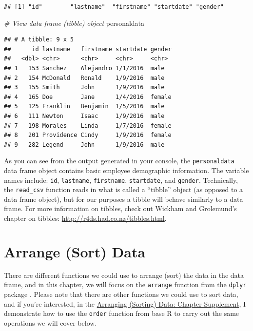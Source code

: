 \documentclass[]{book}
\newenvironment{Shaded}{\begin{snugshade}}{\end{snugshade}}
\newcommand{\CommentTok}[1]{\textcolor[rgb]{0.56,0.35,0.01}{\textit{#1}}}
\newcommand{\NormalTok}[1]{#1}
\begin{document}
\begin{verbatim}
## [1] "id"        "lastname"  "firstname" "startdate" "gender"
\end{verbatim}

\begin{Shaded}
\begin{Highlighting}[]
\CommentTok{# View data frame (tibble) object}
\NormalTok{personaldata}
\end{Highlighting}
\end{Shaded}

\begin{verbatim}
## # A tibble: 9 x 5
##      id lastname   firstname startdate gender
##   <dbl> <chr>      <chr>     <chr>     <chr> 
## 1   153 Sanchez    Alejandro 1/1/2016  male  
## 2   154 McDonald   Ronald    1/9/2016  male  
## 3   155 Smith      John      1/9/2016  male  
## 4   165 Doe        Jane      1/4/2016  female
## 5   125 Franklin   Benjamin  1/5/2016  male  
## 6   111 Newton     Isaac     1/9/2016  male  
## 7   198 Morales    Linda     1/7/2016  female
## 8   201 Providence Cindy     1/9/2016  female
## 9   282 Legend     John      1/9/2016  male
\end{verbatim}

As you can see from the output generated in your console, the
\texttt{personaldata} data frame object contains basic employee
demographic information. The variable names include: \texttt{id},
\texttt{lastname}, \texttt{firstname}, \texttt{startdate}, and
\texttt{gender}. Technically, the \texttt{read\_csv} function reads in
what is called a ``tibble'' object (as opposed to a data frame object),
but for our purposes a tibble will behave similarly to a data frame. For
more information on tibbles, check out Wickham and Grolemund's
\citeyearpar{wickham2017} chapter on tibbles:
\url{http://r4ds.had.co.nz/tibbles.html}.

\section{Arrange (Sort) Data}\label{arrangebyvalues}

There are different functions we could use to arrange (sort) the data in
the data frame, and in this chapter, we will focus on the
\texttt{arrange} function from the \texttt{dplyr} package
\citep{R-dplyr}. Please note that there are other functions we could use
to sort data, and if you're interested, in the
\protect\hyperlink{arrange_supplement}{Arranging (Sorting) Data: Chapter
Supplement}, I demonstrate how to use the \texttt{order} function from
base R to carry out the same operations we will cover below.
\end{document}
